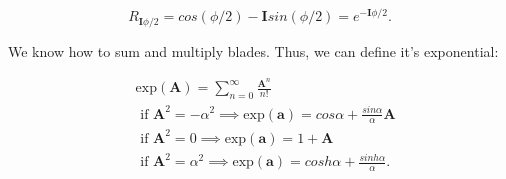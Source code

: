 \begin{displaymath}
    R_{\mathbf I \phi/2} = cos(\phi/2) - \mathbf I sin(\phi/2) = e^{-\mathbf I\phi/2}.
\end{displaymath}

We know how to sum and multiply blades. Thus, we can define it's exponential:

\begin{align}
    &\text{exp}(\mathbf A) = \sum^\infty_{n=0} \frac{\mathbf A^n}{n!} \\
    &\text{ if }\mathbf A^2 =-\alpha^2 \implies \text{exp}(\mathbf a) = cos\alpha + \frac{sin\alpha}{\alpha} \mathbf A \\
    &\text{ if }\mathbf A^2 = 0 \implies \text{exp}(\mathbf a) = 1 + \mathbf A\\
    &\text{ if }\mathbf A^2 =\alpha^2 \implies \text{exp}(\mathbf a) = cosh \alpha + \frac{sinh \alpha}{\alpha}.
\end{align}

